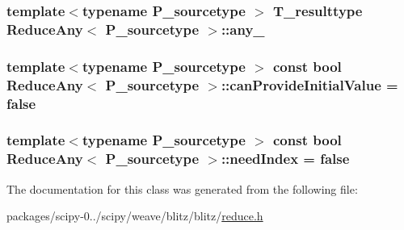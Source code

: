 \subsubsection[{any\+\_\+}]{\setlength{\rightskip}{0pt plus 5cm}template$<$typename P\+\_\+sourcetype $>$ {\bf T\+\_\+resulttype} {\bf Reduce\+Any}$<$ P\+\_\+sourcetype $>$\+::any\+\_\+\hspace{0.3cm}{\ttfamily [protected]}}\label{classReduceAny_a4d1558fa9e8d342395639157ef3e7847}
\hypertarget{classReduceAny_a9e5f5ff845af8eecfdb172a1f5c69200}{}
\subsubsection[{can\+Provide\+Initial\+Value}]{\setlength{\rightskip}{0pt plus 5cm}template$<$typename P\+\_\+sourcetype $>$ const {\bf bool} {\bf Reduce\+Any}$<$ P\+\_\+sourcetype $>$\+::can\+Provide\+Initial\+Value = {\bf false}\hspace{0.3cm}{\ttfamily [static]}}\label{classReduceAny_a9e5f5ff845af8eecfdb172a1f5c69200}
\hypertarget{classReduceAny_a6687c9a352b60aa42902a6ae04b5e272}{}
\subsubsection[{need\+Index}]{\setlength{\rightskip}{0pt plus 5cm}template$<$typename P\+\_\+sourcetype $>$ const {\bf bool} {\bf Reduce\+Any}$<$ P\+\_\+sourcetype $>$\+::need\+Index = {\bf false}\hspace{0.3cm}{\ttfamily [static]}}\label{classReduceAny_a6687c9a352b60aa42902a6ae04b5e272}


The documentation for this class was generated from the following file\+:\begin{DoxyCompactItemize}
\item 
packages/scipy-\/0../scipy/weave/blitz/blitz/\hyperlink{reduce_8h}{reduce.\+h}\end{DoxyCompactItemize}
